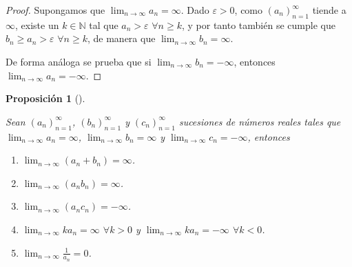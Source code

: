 \documentclass[
  a4paper,
]{scrreport}
\providecommand{\tightlist}{%
  \setlength{\itemsep}{0pt}\setlength{\parskip}{0pt}}\usepackage{longtable,booktabs,array}
\theoremstyle{plain}
\theoremstyle{plain}
\theoremstyle{definition}
\theoremstyle{definition}
\theoremstyle{plain}
\newtheorem{proposition}{Proposición}[chapter]
\theoremstyle{definition}
\theoremstyle{remark}
\begin{document}
\begin{tcolorbox}[enhanced jigsaw, rightrule=.15mm, toptitle=1mm, colbacktitle=quarto-callout-note-color!10!white, bottomrule=.15mm, opacityback=0, arc=.35mm, breakable, toprule=.15mm, left=2mm, coltitle=black, colback=white, opacitybacktitle=0.6, titlerule=0mm, colframe=quarto-callout-note-color-frame, bottomtitle=1mm, title=\textcolor{quarto-callout-note-color}{\faInfo}\hspace{0.5em}{Demostración}, leftrule=.75mm]

\begin{proof}

Supongamos que \(\lim_{n\to\infty}a_n=\infty\). Dado \(\varepsilon>0\),
como \((a_n)_{n=1}^\infty\) tiende a \(\infty\), existe un
\(k\in\mathbb{N}\) tal que \(a_n>\varepsilon\) \(\forall n\geq k\), y
por tanto también se cumple que \(b_n\geq a_n>\varepsilon\)
\(\forall n\geq k\), de manera que \(\lim_{n\to\infty}b_n=\infty\).

De forma análoga se prueba que si \(\lim_{n\to\infty}b_n=-\infty\),
entonces \(\lim_{n\to\infty}a_n=-\infty\).

\end{proof}

\end{tcolorbox}

\begin{proposition}[]\protect\hypertarget{prp-algebra-sucesiones-propiamentes-divergentes}{}\label{prp-algebra-sucesiones-propiamentes-divergentes}

Sean \((a_n)_{n=1}^\infty\), \((b_n)_{n=1}^\infty\) y
\((c_n)_{n=1}^\infty\) sucesiones de números reales tales que
\(\lim_{n\to\infty}a_n=\infty\), \(\lim_{n\to\infty}b_n=\infty\) y
\(\lim_{n\to\infty}c_n=-\infty\), entonces

\begin{enumerate}
\def\labelenumi{\alph{enumi}.}
\tightlist
\item
  \(\lim_{n\to\infty}(a_n+b_n)=\infty\).
\item
  \(\lim_{n\to\infty}(a_nb_n)=\infty\).
\item
  \(\lim_{n\to\infty}(a_nc_n)=-\infty\).
\item
  \(\lim_{n\to\infty}ka_n=\infty\) \(\forall k>0\) y
  \(\lim_{n\to\infty}ka_n=-\infty\) \(\forall k<0\).
\item
  \(\lim_{n\to\infty}\frac{1}{a_n}=0\).
\end{enumerate}

\end{proposition}
\end{document}
